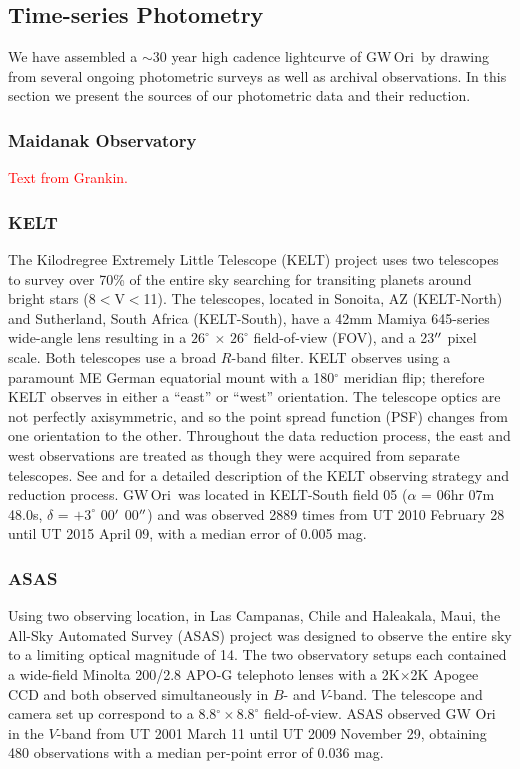 \documentclass[twocolumn]{aastex61}
\newcommand{\todo}[1]{ \textcolor{red}{#1}}
\newcommand{\gw}{GW\,Ori}
\begin{document}
\subsection{Time-series Photometry}
We have assembled a $\sim$30 year high cadence lightcurve of \gw\ by drawing from several ongoing photometric surveys as well as archival observations. In this section we present the sources of our photometric data and their reduction.

\subsubsection{Maidanak Observatory}
\todo{Text from Grankin.}

\subsubsection{KELT}
The Kilodregree Extremely Little Telescope (KELT) project uses two telescopes to survey over 70\% of the entire sky searching for transiting planets around bright stars (8$<$V$<$11). The telescopes, located in Sonoita, AZ (KELT-North) and Sutherland, South Africa (KELT-South), have a 42mm Mamiya 645-series wide-angle lens resulting in a $26^{\circ}$ $\times$ $26^{\circ}$ field-of-view (FOV), and a 23$\mbox{$^{\prime\prime}$}$ pixel scale. Both telescopes use a broad $R$-band filter. KELT observes using a paramount ME German equatorial mount with a 180$^{\circ}$ meridian flip; therefore KELT observes in either a ``east'' or ``west'' orientation. The telescope optics are not perfectly axisymmetric, and so the point spread function (PSF) changes from one orientation to the other. Throughout the data reduction process, the east and west observations are treated as though they were acquired from separate telescopes. See \citet{Siverd12} and \citet{Kuhn16} for a detailed description of the KELT observing strategy and reduction process. \gw\ was located in KELT-South field 05 ($\alpha$ =  06hr 07m 48.0s, $\delta$ = $+3^{\circ}$ 00$\mbox{$^\prime$}$ 00$\mbox{$^{\prime\prime}$}$) and was observed 2889 times from UT 2010 February 28 until UT 2015 April 09, with a median error of 0.005 mag.

\subsubsection{ASAS}
Using two observing location, in Las Campanas, Chile and Haleakala, Maui, the All-Sky Automated Survey (ASAS) project was designed to observe the entire sky to a limiting optical magnitude of 14. The two observatory setups each contained a wide-field Minolta 200/2.8 APO-G telephoto lenses with a 2K$\times$2K Apogee CCD and both observed simultaneously in $B$- and $V$-band. The telescope and camera set up correspond to a 8.8$^{\circ}\times8.8^{\circ}$ field-of-view. ASAS observed GW Ori in the $V$-band from UT 2001 March 11 until UT 2009 November 29, obtaining 480 observations with a median per-point error of 0.036 mag.
\end{document}
